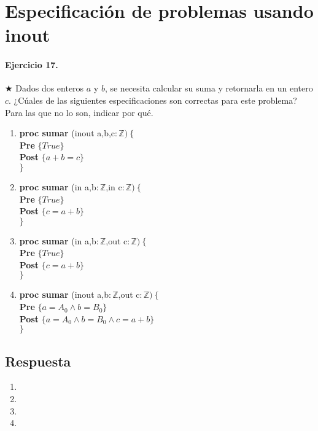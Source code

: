 \documentclass[a4paper]{article}
\begin{document}
\section*{Especificación de problemas usando \textbf{inout}}

\paragraph*{Ejercicio 17.} $\bigstar$ Dados dos enteros $a$ y $b$, se necesita calcular su suma y retornarla en un entero $c$. ¿Cúales de las siguientes especificaciones son correctas para este problema? Para las que no lo son, indicar por qué. 
	\begin{enumerate}[label=\alph*)]
		\item
			\textbf{proc sumar }(inout a,b,c$: \mathbb{Z})\ \{$\smallskip \\
			\hspace*{6mm} \textbf{Pre }$\{True\}$\smallskip \\
			\hspace*{6mm} \textbf{Post }$\{a+b=c\}$\\
			$\}$
		\item
			\textbf{proc sumar }(in a,b$: \mathbb{Z}$,in c$: \mathbb{Z})\ \{$\smallskip \\
			\hspace*{6mm} \textbf{Pre }$\{ True\}$\smallskip \\
			\hspace*{6mm} \textbf{Post }$\{c=a+b\}$\\
			$\}$
		\item
			\textbf{proc sumar }(in a,b$: \mathbb{Z}$,out c$: \mathbb{Z})\ \{$\smallskip \\
			\hspace*{6mm} \textbf{Pre }$\{ True\}$\smallskip \\
			\hspace*{6mm} \textbf{Post }$\{c=a+b\}$\\
			$\}$
		\item
			\textbf{proc sumar }(inout a,b$: \mathbb{Z}$,out c$: \mathbb{Z})\ \{$\smallskip \\
			\hspace*{6mm} \textbf{Pre }$\{ a=A_0\wedge b=B_0\}$\smallskip \\
			\hspace*{6mm} \textbf{Post }$\{ a=A_0\wedge b=B_0\wedge c=a+b\}$\\
			$\}$
	\end{enumerate}
\subsection*{Respuesta}
	\begin{enumerate}[label=\alph*)]
		\item
		\item
		\item
		\item
	\end{enumerate}
	
\end{document}
